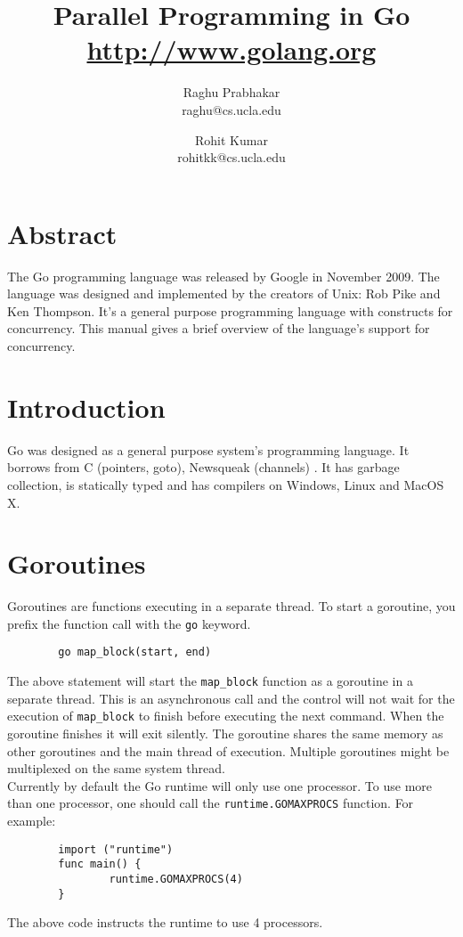 \documentclass[8pt, twocolumn]{article}
\title{Parallel Programming in Go \\
\small{\url{http://www.golang.org}}
}
\author{
  Raghu Prabhakar
  \\\small{raghu@cs.ucla.edu}
  \and 
  Rohit Kumar 
  \\\small{rohitkk@cs.ucla.edu}
}
\begin{document}
\maketitle
\section{Abstract}
The Go programming language was released by Google in November
2009. The language was designed and implemented by the creators of
Unix: Rob Pike and Ken Thompson. It's a general purpose programming
language with constructs for concurrency. This manual gives a brief
overview of the language's support for concurrency.\\
\section{Introduction}
Go was designed as a general purpose system's programming language. It
borrows from C (pointers, goto), Newsqueak (channels) \cite{gofaq}. It has garbage
collection, is statically typed and has compilers on Windows, Linux
and MacOS X. 
\section{Goroutines}
Goroutines are functions executing in a separate thread. To start a
goroutine, you prefix the function call with the \verb=go= keyword.
\begin{verbatim}
        go map_block(start, end)
\end{verbatim}
The above statement will start the \verb=map_block= function as a
goroutine in a separate thread. This is an asynchronous call and the
control will not wait for the execution of \verb=map_block= to finish
before executing the next command. When the goroutine finishes it will
exit silently. The goroutine shares the same memory
as other goroutines and the main thread of execution. Multiple
goroutines might be multiplexed on the same system thread.\\

Currently by default the Go runtime will only use one processor. To
use more than one processor, one should call the
\verb=runtime.GOMAXPROCS= function. For example:
\begin{verbatim}
        import ("runtime")        
        func main() {
                runtime.GOMAXPROCS(4)
        }
\end{verbatim}
The above code instructs the runtime to use 4 processors.
\end{document}
